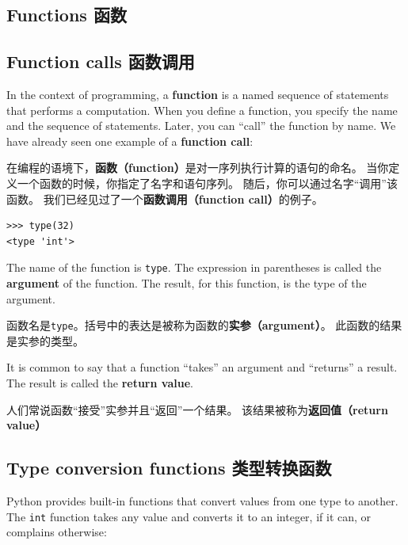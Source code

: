 \documentclass[10pt]{book}
\begin{document}
\begin{CJK}{UTF8}{gbsn}
\chapter{Functions 函数}
\label{funcchap}

\section{Function calls 函数调用}
\label{functionchap}

In the context of programming, a {\bf function} is a named sequence of
statements that performs a computation.  When you define a function,
you specify the name and the sequence of statements.  Later, you can
``call'' the function by name.  
We have already seen one example of a {\bf function call}:

在编程的语境下，{\bf 函数（function）}是对一序列执行计算的语句的命名。
当你定义一个函数的时候，你指定了名字和语句序列。
随后，你可以通过名字``调用''该函数。
我们已经见过了一个{\bf 函数调用（function call）}的例子。

\begin{verbatim}
>>> type(32)
<type 'int'>
\end{verbatim}
%
The name of the function is {\tt type}.  The expression in parentheses
is called the {\bf argument} of the function.  The result, for this
function, is the type of the argument.

函数名是{\tt type}。括号中的表达是被称为函数的{\bf 实参（argument）}。
此函数的结果是实参的类型。

It is common to say that a function ``takes'' an argument and ``returns''
a result.  The result is called the {\bf return value}.

人们常说函数``接受''实参并且``返回''一个结果。
该结果被称为{\bf 返回值（return value）}


\section{Type conversion functions 类型转换函数}



Python provides built-in functions that convert values
from one type to another.  The {\tt int} function takes any value and
converts it to an integer, if it can, or complains otherwise:


\end{CJK}
\end{document}
